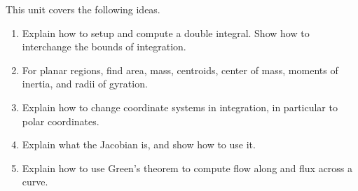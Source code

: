 \newcommand{\sageDoubleIntegralCheckerURL}{http://bmw.byuimath.com/dokuwiki/doku.php?id=double_integral_calculator}


\noindent 
This unit covers the following ideas. 
\begin{enumerate}
\item Explain how to setup and compute a double integral. Show how to interchange the bounds of integration. 
\item For planar regions, find area, mass, centroids, center of mass, moments of inertia, and radii of gyration.
\item Explain how to change coordinate systems in integration, in particular to polar coordinates. 
\item Explain what the Jacobian is, and show how to use it.
\item Explain how to use Green's theorem to compute flow along and flux across a curve. 
\end{enumerate}


